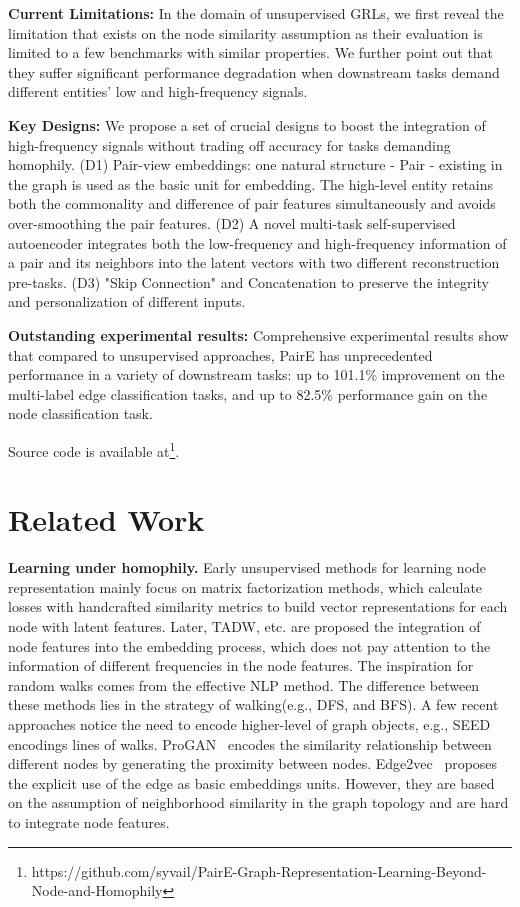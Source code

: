 \documentclass[10pt,journal,compsoc]{IEEEtran}
\begin{document}
\noindent\textbf{Current Limitations: } In the domain of unsupervised GRLs, we first reveal the limitation that exists on the node similarity assumption as their evaluation is limited to a few benchmarks with similar properties. We further point out that they suffer significant performance degradation when downstream tasks demand different entities' low and high-frequency signals.

\noindent\textbf{Key Designs:} We propose a set of crucial designs to boost the integration of high-frequency signals without trading off accuracy for tasks demanding homophily. (D1) Pair-view embeddings:  one natural structure - Pair - existing in the graph is used as the basic unit for embedding. The high-level entity retains both the commonality and difference of pair features simultaneously and avoids over-smoothing the pair features. (D2) A novel multi-task self-supervised autoencoder integrates both the low-frequency and high-frequency information of a pair and its neighbors into the latent vectors with two different reconstruction pre-tasks. (D3) "Skip Connection" and Concatenation to preserve the integrity and personalization of different inputs.

\noindent\textbf{Outstanding experimental results: } Comprehensive experimental results show that compared to unsupervised approaches, PairE has unprecedented performance in a variety of downstream tasks: up to 101.1\% improvement on the multi-label edge classification tasks, and up to 82.5\% performance gain on the node classification task. 

Source code is available at\footnote{https://github.com/syvail/PairE-Graph-Representation-Learning-Beyond-Node-and-Homophily}.


\section{Related Work}
\noindent\textbf{Learning under homophily.} Early unsupervised methods for learning node representation mainly focus on matrix factorization methods, which calculate losses with handcrafted similarity metrics to build vector representations for each node\cite{Wang19-seed} with latent features. Later, TADW\cite{Yang15,yang2019low}, etc. are proposed the integration of node features into the embedding process, which does not pay attention to the information of different frequencies in the node features. The inspiration for random walks comes from the effective NLP method. The difference between these methods lies in the strategy of walking(e.g., DFS, and BFS)\cite{Perozzi14, Tang15, Grover16}. A few recent approaches notice the need to encode higher-level of graph objects, e.g., SEED encodings lines of walks\cite{Wang19-seed}. ProGAN~\cite{gao2019progan} encodes the similarity relationship between different nodes by generating the proximity between nodes. Edge2vec~\cite{wang2020edge2vec} proposes the explicit use of the edge as basic embeddings units. However, they are based on the assumption of neighborhood similarity in the graph topology and are hard to integrate node features.
\end{document}
